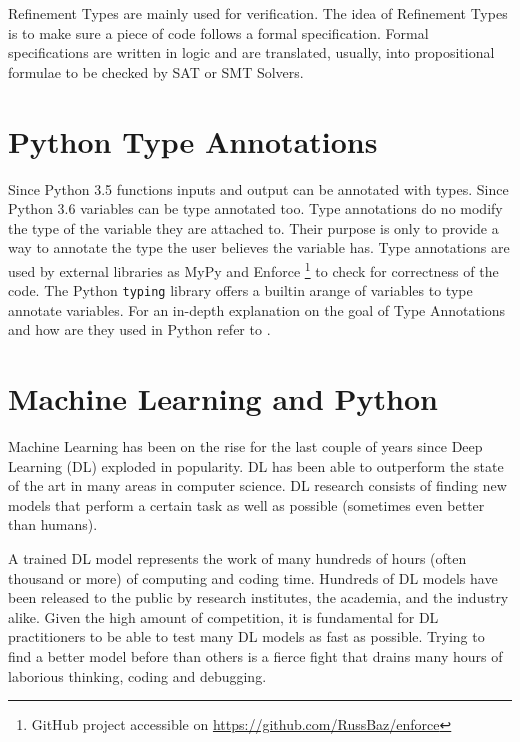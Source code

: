 \documentclass[
11pt, %
english, %
singlespacing, %
headsepline, %
]{MastersDoctoralThesis} %
\begin{document}
Refinement Types \autocite{rushby_subtypes_1998} are mainly used for
verification. The idea of Refinement Types is to make sure a piece of
code follows a formal specification. Formal specifications are written
in logic and are translated, usually, into propositional formulae to be
checked by SAT or SMT Solvers.

\hypertarget{python-type-annotations}{%
\section{Python Type Annotations}\label{python-type-annotations}}

Since Python 3.5 \autocite{pep484} functions inputs and output can be
annotated with types. Since Python 3.6 \autocite{pep526} variables can
be type annotated too. Type annotations do no modify the type of the
variable they are attached to. Their purpose is only to provide a way to
annotate the type the user believes the variable has. Type annotations
are used by external libraries as MyPy \autocite{lehtosalo2016mypy} and
Enforce \footnote{GitHub project accessible on
  \url{https://github.com/RussBaz/enforce}} to check for correctness of
the code. The Python \texttt{typing} library offers a builtin arange of
variables to type annotate variables. For an in-depth explanation on the
goal of Type Annotations and how are they used in Python refer to
\autocite{pep483}.

\hypertarget{machine-learning-and-python}{%
\section{Machine Learning and
Python}\label{machine-learning-and-python}}

Machine Learning has been on the rise for the last couple of years since
Deep Learning (DL) exploded in popularity. DL has been able to
outperform the state of the art in many areas in computer science. DL
research consists of finding new models that perform a certain task as
well as possible (sometimes even better than humans).

A trained DL model represents the work of many hundreds of hours (often
thousand or more) of computing and coding time. Hundreds of DL models
have been released to the public by research institutes, the academia,
and the industry alike. Given the high amount of competition, it is
fundamental for DL practitioners to be able to test many DL models as
fast as possible. Trying to find a better model before than others is a
fierce fight that drains many hours of laborious thinking, coding and
debugging.
\end{document}

